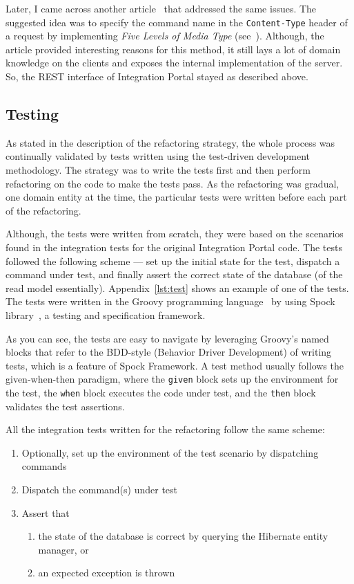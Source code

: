 \documentclass{book}
\begin{document}
Later, I came across another article~\cite{cqrs-rest} that addressed the
same issues. The suggested idea was to specify the command name in the
\texttt{Content-Type} header of a request by implementing \emph{Five Levels of Media Type} (see~\cite{5lmt}). Although, the article
provided interesting reasons for this method, it still lays a lot of domain
knowledge on the clients and exposes the internal implementation of the
server. So, the REST interface of Integration Portal stayed as
described above.

\subsection{Testing}\label{testing}

As stated in the description of the refactoring strategy, the whole
process was continually validated by tests written using the test-driven
development methodology. The strategy was to write the tests first and
then perform refactoring on the code to make the tests pass. As the
refactoring was gradual, one domain entity at the time, the particular
tests were written before each part of the refactoring.

Although, the tests were written from scratch, they were based on the
scenarios found in the integration tests for the original Integration
Portal code. The tests followed the following scheme --- set up the
initial state for the test, dispatch a command under test, and finally
assert the correct state of the database (of the
read model essentially). Appendix~\ref{lst:test} shows an
example of one of the tests. The tests were written in the Groovy
programming language~\cite{groovy} by using Spock library~\cite{spock},
a testing and specification framework.

As you can see, the tests are easy to navigate by leveraging Groovy's
named blocks that refer to the BDD-style (Behavior Driver Development)
of writing tests, which is a feature of Spock Framework. A test method
usually follows the given-when-then paradigm, where the \texttt{given}
block sets up the environment for the test, the \texttt{when} block
executes the code under test, and the \texttt{then} block validates the
test assertions.

All the integration tests written for the refactoring follow the same
scheme:

\begin{enumerate}
\def\labelenumi{\arabic{enumi}.}
\tightlist
\item
  Optionally, set up the environment of the test scenario by dispatching
  commands
\item
  Dispatch the command(s) under test
\item
  Assert that

  \begin{enumerate}
  \def\labelenumii{\alph{enumii})}
  \tightlist
  \item
    the state of the database is correct by querying the Hibernate
    entity manager, or
  \item
    an expected exception is thrown
  \end{enumerate}
\end{enumerate}
\end{document}
